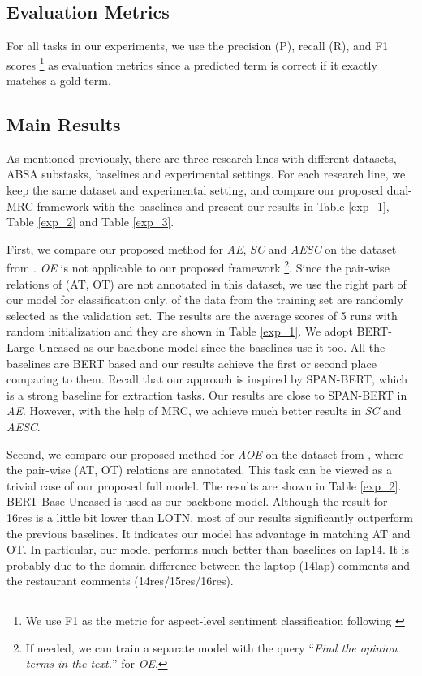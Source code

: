 \documentclass[letterpaper]{article} \usepackage{aaai21}  \usepackage{times}  \usepackage{helvet} \usepackage{courier}  \usepackage[hyphens]{url}  \usepackage{graphicx} \urlstyle{rm} \def\UrlFont{\rm}  \usepackage{natbib}  \usepackage{caption}
\begin{document}
\subsection{Evaluation Metrics}
For all tasks in our experiments, we use the precision (P), recall (R), and F1 scores
\footnote{We use F1 as the metric for aspect-level sentiment classification following \cite{chen-qian-2020-relation}} as evaluation metrics since
a predicted term is correct if it exactly matches a gold term. 



\subsection{Main Results}
As mentioned previously, there are three research lines with different datasets, ABSA substasks, baselines and experimental settings. 
For each research line, we keep the same dataset and experimental setting, and compare our proposed dual-MRC framework with the baselines and present our results in Table \ref{exp_1}, Table \ref{exp_2} and Table \ref{exp_3}.

First, we compare our proposed method for \emph{AE}, \emph{SC} and \emph{AESC} on the dataset from \cite{DBLP:conf/aaai/WangPDX17}. 
\emph{OE} is not applicable to our proposed framework
\footnote{If needed, we can train a separate model with the query ``\emph{Find the opinion terms in the text.}'' for \emph{OE}.}. 
Since the pair-wise relations of (AT, OT) are not annotated in this dataset, we use the right part of our model for classification only. 
 of the data from the training set are randomly selected as the validation set. 
The results are the average scores of 5 runs with random initialization and they are shown in Table \ref{exp_1}. 
We adopt BERT-Large-Uncased as our backbone model since the baselines use it too.
All the baselines are BERT based and our results achieve the first or second place comparing to them. 
Recall that our approach is inspired by SPAN-BERT, which is a strong baseline for extraction tasks.
Our results are close to SPAN-BERT in \emph{AE}.
However, with the help of MRC, we achieve much better results in \emph{SC} and \emph{AESC}. 

Second, we compare our proposed method for \emph{AOE} on the dataset from \cite{fan2019target}, where the pair-wise (AT, OT) relations are annotated. 
This task can be viewed as a trivial case of our proposed full model. The results are shown in Table \ref{exp_2}. 
BERT-Base-Uncased is used as our backbone model. 
Although  the result for 16res is a little bit lower than LOTN, most of our results significantly outperform the previous baselines. 
It indicates our model has advantage in matching AT and OT. In particular, our model performs much better than baselines on lap14. It is probably due to 
the domain difference between the laptop (14lap) comments and the restaurant comments (14res/15res/16res). 
\end{document}
